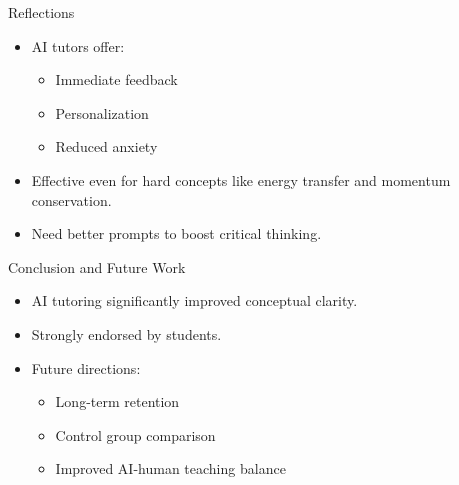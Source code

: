 \documentclass{beamer}
\begin{document}
\begin{frame}{Reflections}
\begin{itemize}
    \item AI tutors offer:
    \begin{itemize}
        \item Immediate feedback
        \item Personalization
        \item Reduced anxiety
    \end{itemize}
    \item Effective even for hard concepts like energy transfer and momentum conservation.
    \item Need better prompts to boost critical thinking.
\end{itemize}
\end{frame}

\begin{frame}{Conclusion and Future Work}
\begin{itemize}
    \item AI tutoring significantly improved conceptual clarity.
    \item Strongly endorsed by students.
    \item Future directions:
    \begin{itemize}
        \item Long-term retention
        \item Control group comparison
        \item Improved AI-human teaching balance
    \end{itemize}
\end{itemize}
\end{frame}
\end{document}

